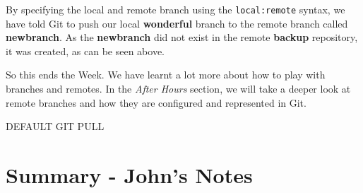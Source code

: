 By specifying the local and remote branch using the \texttt{local:remote} syntax, we have told Git to push our local \textbf{wonderful} branch to the remote branch called \textbf{newbranch}.  As the \textbf{newbranch} did not exist in the remote \textbf{backup} repository, it was created, as can be seen above.

So this ends the Week.  We have learnt a lot more about how to play with branches and remotes.  In the \emph{After Hours} section, we will take a deeper look at remote branches and how they are configured and represented in Git.

DEFAULT GIT PULL


\clearpage

\section{Summary - John's Notes}
